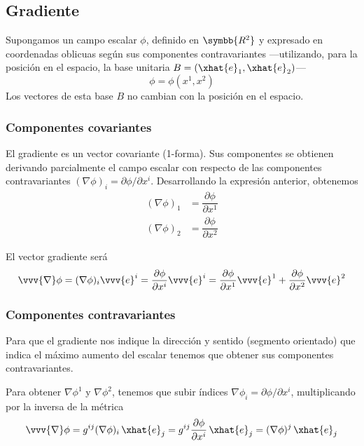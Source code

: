 \subsection{Gradiente}
Supongamos un campo escalar $\phi$, definido en $\symbb{R^2}$ y expresado en coordenadas
oblicuas según sus componentes contravariantes ---utilizando, para la posición en el
espacio, la base unitaria $B= (\xhat{e}_1,\xhat{e}_2)$---
\begin{equation}
  \phi = \phi(x^1, x^2)
\end{equation}
Los vectores de esta base $B$ no cambian con la posición en el espacio.

\subsubsection{Componentes covariantes}
El gradiente es un vector covariante (1-forma). Sus componentes se obtienen derivando
parcialmente el campo escalar con respecto de las componentes contravariantes
$(\nabla\phi)_i = \partial\phi/\partial x^i$. Desarrollando la expresión anterior,
obtenemos
\begin{align}
  (\nabla\phi)_1 &= \dfrac{\partial\phi}{\partial x^1}\\
  (\nabla\phi)_2 &= \dfrac{\partial\phi}{\partial x^2}
\end{align}

El vector gradiente será
\begin{equation}
  \vvv{\nabla}\phi
  = (\nabla\phi)_i\vvv{e}^i
  = \dfrac{\partial\phi}{\partial x^i}\vvv{e}^i
  = \dfrac{\partial\phi}{\partial x^1}\vvv{e}^1
  + \dfrac{\partial\phi}{\partial x^2}\vvv{e}^2
\end{equation}

\subsubsection{Componentes contravariantes}
Para que el gradiente nos indique la dirección y sentido (segmento orientado) que indica
el máximo aumento del escalar tenemos que obtener sus componentes contravariantes.

Para obtener $\nabla\phi^1$ y $\nabla\phi^2$, tenemos que subir índices
$\nabla\phi_i=\partial\phi/\partial x^i$, multiplicando por la inversa de la métrica
\begin{equation}
  \vvv{\nabla}\phi
  = g^{ij}(\nabla\phi)_i\,\xhat{e}_j
  = g^{ij} \dfrac{\partial\phi}{\partial x^i}\,\xhat{e}_j
  = (\nabla\phi)^j\,\xhat{e}_j
\end{equation}

